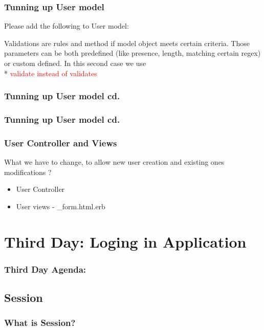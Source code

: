 \documentclass{beamer}
\theoremstyle{mystyle}
\begin{document}
    \begin{frame}
      \frametitle{Tunning up User model}
      Please add the following to User model:
      \railsusermodelI 
      \begin{definition}
        Validations are rules and method if model object meets certain criteria.
        Those parameters can be both predefined (like presence, length, matching
        certain regex) or custom defined. In this second case we use \\*
        \textcolor{red}{validate instead of validates}
      \end{definition}
    \end{frame}
    
    \begin{frame}
      \frametitle{Tunning up User model cd.}
      \railsusermodelII
    \end{frame}
    
    \begin{frame}
      \frametitle{Tunning up User model cd.}
      \railsusermodelIII
    \end{frame}
    
    \begin{frame}
      \frametitle{User Controller and Views}
      What we have to change, to allow new user creation and existing ones
      modifications ?
      \begin{itemize}
      \item User Controller
        \railsusercontroller
      \item User views - \_form.html.erb
        \railsuserviewform
      \end{itemize}
      
    \end{frame}

\section{Third Day: Loging in Application}
    \begin{frame}
      \frametitle{Third Day Agenda:}
      \tableofcontents
      [
      currentsection,
      sectionstyle=hide/hide,
      subsectionstyle=show/show/hide
      ]
    \end{frame}
  \subsection{Session}
    \begin{frame}
      \frametitle{What is Session?}
    \end{frame}
\end{document}
